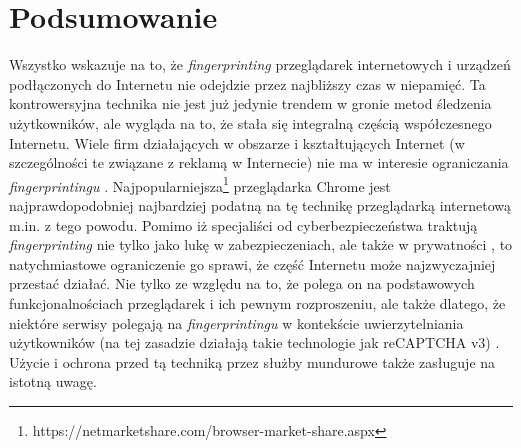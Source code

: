 \chapter{Podsumowanie}
Wszystko wskazuje na to, że \emph{fingerprinting} przeglądarek internetowych i
urządzeń podłączonych do Internetu nie odejdzie przez najbliższy czas w
niepamięć. Ta kontrowersyjna technika nie jest już jedynie trendem w gronie
metod śledzenia użytkowników, ale wygląda na to, że stała się integralną częścią
współczesnego Internetu. Wiele firm działających w obszarze i kształtujących
Internet (w szczególności te związane z reklamą w Internecie) nie ma w interesie
ograniczania \emph{fingerprintingu} \cite{al2018beyond}.
Najpopularniejsza\footnote{https://netmarketshare.com/browser-market-share.aspx}
przeglądarka Chrome jest najprawdopodobniej najbardziej podatną \cite{al2017not}
na tę technikę przeglądarką internetową m.in. z tego powodu. Pomimo iż
specjaliści od cyberbezpieczeństwa traktują \emph{fingerprinting} nie tylko jako
lukę w zabezpieczeniach, ale także w prywatności
\cite{mowery2012pixel,al2020too}, to natychmiastowe ograniczenie go sprawi, że
część Internetu może najzwyczajniej przestać działać. Nie tylko ze względu na
to, że polega on na podstawowych funkcjonalnościach przeglądarek i ich pewnym
rozproszeniu, ale także dlatego, że niektóre serwisy polegają na
\emph{fingerprintingu} w kontekście uwierzytelniania użytkowników (na tej
zasadzie działają takie technologie jak reCAPTCHA v3) \cite{45581}. Użycie i
ochrona przed tą techniką przez służby mundurowe także zasługuje na istotną
uwagę.
